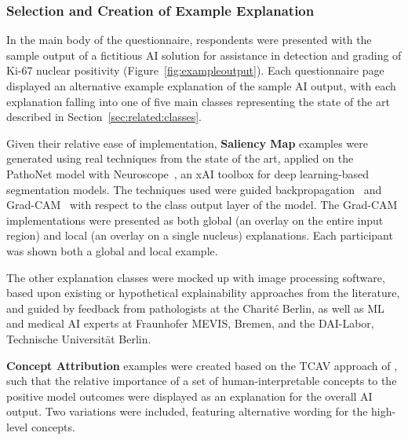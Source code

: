 
\subsubsection{Selection and Creation of Example Explanation}

In the main body of the questionnaire, respondents were presented with the sample output of a fictitious AI solution for assistance in detection and grading of Ki-67 nuclear positivity (Figure~\ref{fig:exampleoutput}). Each questionnaire page displayed an alternative example explanation of the sample AI output, with each explanation falling into one of five main classes representing the state of the art described in Section~\ref{sec:related:classes}.

Given their relative ease of implementation, \textbf{Saliency Map} examples were generated using real techniques from the state of the art, applied on the PathoNet model with Neuroscope~\cite{schorr_neuroscope_2021}, an xAI toolbox for deep learning-based segmentation models. The techniques used were guided backpropagation~\cite{springenberg2014striving} and Grad-CAM~\cite{selvaraju2017grad} with respect to the class output layer of the model. The Grad-CAM implementations were presented as both global (an overlay on the entire input region) and local (an overlay on a single nucleus) explanations. Each participant was shown both a global and local example.

The other explanation classes were mocked up with image processing software, based upon existing or hypothetical explainability approaches from the literature, and guided by feedback from pathologists at the Charité Berlin, as well as ML and medical AI experts at Fraunhofer MEVIS, Bremen, and the DAI-Labor, Technische Universität Berlin.

\textbf{Concept Attribution} examples were created based on the TCAV approach of \citet{kim2018interpretability}, such that the relative importance of a set of human-interpretable concepts to the positive model outcomes were displayed as an explanation for the overall AI output. Two variations were included, featuring alternative wording for the high-level concepts. 

